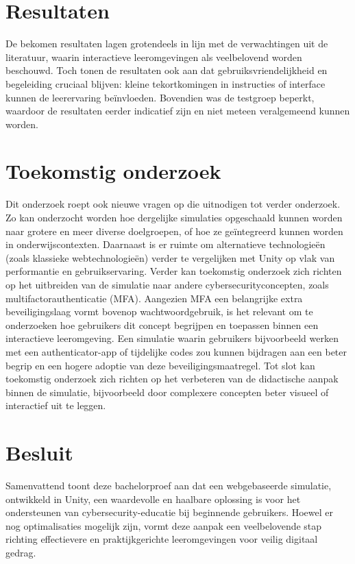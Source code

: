\section{Resultaten}
De bekomen resultaten lagen grotendeels in lijn met de verwachtingen uit de literatuur, waarin interactieve leeromgevingen als veelbelovend worden beschouwd. Toch tonen de resultaten ook aan dat gebruiksvriendelijkheid en begeleiding cruciaal blijven: kleine tekortkomingen in instructies of interface kunnen de leerervaring beïnvloeden. Bovendien was de testgroep beperkt, waardoor de resultaten eerder indicatief zijn en niet meteen veralgemeend kunnen worden.

\section{Toekomstig onderzoek}
Dit onderzoek roept ook nieuwe vragen op die uitnodigen tot verder onderzoek. Zo kan onderzocht worden hoe dergelijke simulaties opgeschaald kunnen worden naar grotere en meer diverse doelgroepen, of hoe ze geïntegreerd kunnen worden in onderwijscontexten. 
Daarnaast is er ruimte om alternatieve technologieën (zoals klassieke webtechnologieën) verder te vergelijken met Unity op vlak van performantie en gebruikservaring.
Verder kan toekomstig onderzoek zich richten op het uitbreiden van de simulatie naar andere cybersecurityconcepten, zoals multifactorauthenticatie (MFA). Aangezien MFA een belangrijke extra beveiligingslaag vormt bovenop wachtwoordgebruik, is het relevant om te onderzoeken hoe gebruikers dit concept begrijpen en toepassen binnen een interactieve leeromgeving. Een simulatie waarin gebruikers bijvoorbeeld werken met een authenticator-app of tijdelijke codes zou kunnen bijdragen aan een beter begrip en een hogere adoptie van deze beveiligingsmaatregel. 
Tot slot kan toekomstig onderzoek zich richten op het verbeteren van de didactische aanpak binnen de simulatie, bijvoorbeeld door complexere concepten beter visueel of interactief uit te leggen.

\section{Besluit}
Samenvattend toont deze bachelorproef aan dat een webgebaseerde simulatie, ontwikkeld in Unity, een waardevolle en haalbare oplossing is voor het ondersteunen van cybersecurity-educatie bij beginnende gebruikers. Hoewel er nog optimalisaties mogelijk zijn, vormt deze aanpak een veelbelovende stap richting effectievere en praktijkgerichte leeromgevingen voor veilig digitaal gedrag.


